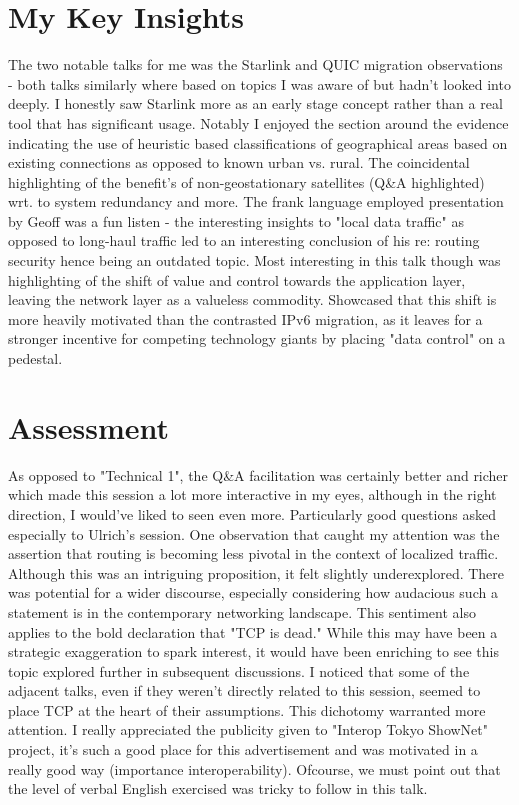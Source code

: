 \documentclass[twocolumn]{article}
\begin{document}
\section*{My Key Insights}
The two notable talks for me was the Starlink and QUIC migration observations - both talks similarly where based on topics I was aware of but hadn't looked into deeply. I honestly saw Starlink more as an early stage concept rather than a real tool that has significant usage. Notably I enjoyed the section around the evidence indicating the use of heuristic based classifications of geographical areas based on existing connections as opposed to known urban vs. rural. The coincidental highlighting of the benefit's of non-geostationary satellites (Q\&A highlighted) wrt. to system redundancy and more. The frank language employed presentation by Geoff was a fun listen - the interesting insights to "local data traffic" as opposed to long-haul traffic led to an interesting conclusion of his re: routing security hence being an outdated topic. Most interesting in this talk though was highlighting of the shift of value and control towards the application layer, leaving the network layer as a valueless commodity. Showcased that this shift is more heavily motivated than the contrasted IPv6 migration, as it leaves for a stronger incentive for competing technology giants by placing "data control" on a pedestal.


\newpage

\section*{Assessment}
As opposed to "Technical 1", the Q\&A facilitation was certainly better and richer which made this session a lot more interactive in my eyes, although in the right direction, I would've liked to seen even more. Particularly good questions asked especially to Ulrich's session. One observation that caught my attention was the assertion that routing is becoming less pivotal in the context of localized traffic. Although this was an intriguing proposition, it felt slightly underexplored. There was potential for a wider discourse, especially considering how audacious such a statement is in the contemporary networking landscape. This sentiment also applies to the bold declaration that "TCP is dead." While this may have been a strategic exaggeration to spark interest, it would have been enriching to see this topic explored further in subsequent discussions. I noticed that some of the adjacent talks, even if they weren't directly related to this session, seemed to place TCP at the heart of their assumptions. This dichotomy warranted more attention. I really appreciated the publicity given to "Interop Tokyo ShowNet" project, it's such a good place for this advertisement and was motivated in a really good way (importance interoperability). Ofcourse, we must point out that the level of verbal English exercised was tricky to follow in this talk.
\end{document}
